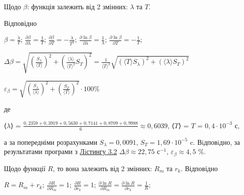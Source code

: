 \documentclass[12pt,a4paper]{article}
\begin{document}
    Щодо $\beta$: функція залежить від 2 змінних: $\lambda$ та $T$.

    Відповідно

    \begin{center}
        $\displaystyle \beta = \frac{\lambda}{T}$; $\displaystyle \frac{\partial \beta}{\partial \lambda} = \frac{1}{T}$; $\displaystyle \frac{\partial \beta}{\partial T} = -\frac{\lambda}{T^2}$;
        $\displaystyle \frac{\partial \ln \beta}{\partial \lambda} = \frac{1}{\lambda}$; $\displaystyle \frac{\partial \ln \beta}{\partial T} = -\frac{1}{T}$;
    \end{center}

    \begin{center}
        $\displaystyle \Delta \beta = \sqrt{\left( \frac{S_{\lambda}}{\text{⟨}T\text{⟩}} \right)^2 + \left( \frac{\text{⟨}\lambda\text{⟩}}{\text{⟨}T\text{⟩}^2} S_T \right)^2} =
        \frac{1}{\text{⟨}T\text{⟩}^2} \sqrt{\left(\text{⟨}T\text{⟩} S_{\lambda}\right)^2 + \left(\text{⟨}\lambda\text{⟩} S_T\right)^2}$
    \end{center}

    \begin{center}
        $\displaystyle \varepsilon_{\beta} = \sqrt{\left( \frac{S_{\lambda}}{\text{⟨}\lambda\text{⟩} }\right)^2 +
        \left(\frac{S_T}{\text{⟨}T\text{⟩}} \right)^2} \cdot 100 \%$
    \end{center}

    де

    \begin{center}
        ⟨$\lambda$⟩ = $\displaystyle \frac{0,2359 + 0,3919 + 0,5630 + 0,7141 + 0,8709 + 0,9988}{6} \approx 0,6039$, ⟨$T$⟩ = $T$ = $0,4 \cdot 10^{-3}$ с,
    \end{center}

    а за попередніми розрахунками $S_{\lambda} = 0,0091$, $S_T = 1,69 \cdot 10^{-5}$ c. Вiдповiдно, за результатами
    програми з \hyperlink{listing2}{Лiстингу 3.2} $\Delta \beta \approx 22,75 \text{ с}^{-1}$, $\varepsilon_{\beta} \approx 4,5$ \%.

    Щодо функції $R$, то вона залежить від 2 змінних: $R_m$ та $r_k$. Відповідно

    \begin{center}
        $\displaystyle R = R_m + r_k$; $\displaystyle \frac{\partial R}{\partial R_m} = 1$; $\displaystyle \frac{\partial R}{\partial r_k} = 1$;
        $\displaystyle \frac{\partial \ln R}{\partial R_m} = \frac{\partial \ln R}{\partial r_k} = \frac{1}{R}$;
    \end{center}
\end{document}
